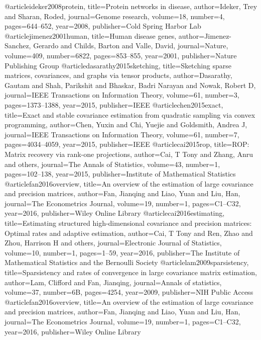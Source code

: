 @article{ideker2008protein,
  title={Protein networks in disease},
  author={Ideker, Trey and Sharan, Roded},
  journal={Genome research},
  volume={18},
  number={4},
  pages={644--652},
  year={2008},
  publisher={Cold Spring Harbor Lab}
}
@article{jimenez2001human,
  title={Human disease genes},
  author={Jimenez-Sanchez, Gerardo and Childs, Barton and Valle, David},
  journal={Nature},
  volume={409},
  number={6822},
  pages={853--855},
  year={2001},
  publisher={Nature Publishing Group}
}
@article{dasarathy2015sketching,
  title={Sketching sparse matrices, covariances, and graphs via tensor products},
  author={Dasarathy, Gautam and Shah, Parikshit and Bhaskar, Badri Narayan and Nowak, Robert D},
  journal={IEEE Transactions on Information Theory},
  volume={61},
  number={3},
  pages={1373--1388},
  year={2015},
  publisher={IEEE}
}
@article{chen2015exact,
  title={Exact and stable covariance estimation from quadratic sampling via convex programming},
  author={Chen, Yuxin and Chi, Yuejie and Goldsmith, Andrea J},
  journal={IEEE Transactions on Information Theory},
  volume={61},
  number={7},
  pages={4034--4059},
  year={2015},
  publisher={IEEE}
}
@article{cai2015rop,
  title={ROP: Matrix recovery via rank-one projections},
  author={Cai, T Tony and Zhang, Anru and others},
  journal={The Annals of Statistics},
  volume={43},
  number={1},
  pages={102--138},
  year={2015},
  publisher={Institute of Mathematical Statistics}
}
@article{fan2016overview,
  title={An overview of the estimation of large covariance and precision matrices},
  author={Fan, Jianqing and Liao, Yuan and Liu, Han},
  journal={The Econometrics Journal},
  volume={19},
  number={1},
  pages={C1--C32},
  year={2016},
  publisher={Wiley Online Library}
}
@article{cai2016estimating,
  title={Estimating structured high-dimensional covariance and precision matrices: Optimal rates and adaptive estimation},
  author={Cai, T Tony and Ren, Zhao and Zhou, Harrison H and others},
  journal={Electronic Journal of Statistics},
  volume={10},
  number={1},
  pages={1--59},
  year={2016},
  publisher={The Institute of Mathematical Statistics and the Bernoulli Society}
}
@article{lam2009sparsistency,
  title={Sparsistency and rates of convergence in large covariance matrix estimation},
  author={Lam, Clifford and Fan, Jianqing},
  journal={Annals of statistics},
  volume={37},
  number={6B},
  pages={4254},
  year={2009},
  publisher={NIH Public Access}
}
@article{fan2016overview,
  title={An overview of the estimation of large covariance and precision matrices},
  author={Fan, Jianqing and Liao, Yuan and Liu, Han},
  journal={The Econometrics Journal},
  volume={19},
  number={1},
  pages={C1--C32},
  year={2016},
  publisher={Wiley Online Library}
}
